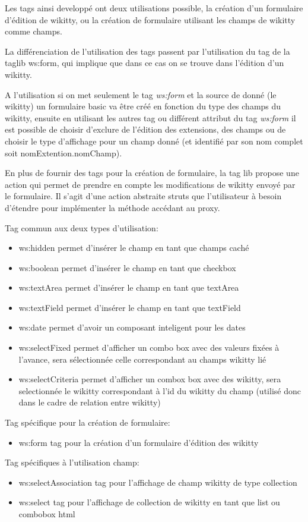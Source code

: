 Les tags ainsi developpé ont deux utilisations possible, la création d'un 
formulaire d'édition de wikitty, ou la création de formulaire utilisant les 
champs de wikitty comme champs. 

La différenciation de l'utilisation des tags passent par l'utilisation du tag 
de la taglib ws:form, qui implique que dans ce cas on se trouve dans l'édition d'un
wikitty.

A l'utilisation si on met seulement le tag \emph{ws:form} et la source de donné 
(le wikitty) un formulaire basic va être créé en fonction du type des champs
du wikitty, ensuite en utilisant les autres tag ou différent attribut du tag 
\emph{ws:form} il est possible de choisir d'exclure de l'édition des extensions,
des champs ou de choisir le type d'affichage pour un champ donné (et identifié
par son nom complet soit nomExtention.nomChamp).

En plus de fournir des tags pour la création de formulaire, la tag lib propose 
une action qui permet de prendre en compte les modifications de wikitty envoyé
par le formulaire. Il s'agit d'une action abstraite struts que l'utilisateur à 
besoin d'étendre pour implémenter la méthode accédant au proxy.

Tag commun aux deux types d'utilisation:
\begin{itemize}
\item ws:hidden permet d'insérer le champ en tant que champs caché
\item ws:boolean permet d'insérer le champ en tant que checkbox 
\item ws:textArea permet d'insérer le champ en tant que textArea
\item ws:textField permet d'insérer le champ en tant que textField
\item ws:date permet d'avoir un composant inteligent pour les dates 
\item ws:selectFixed permet d'afficher un combo box avec des valeurs fixées à 
l'avance, sera sélectionnée celle correspondant au champs wikitty lié
\item ws:selectCriteria permet d'afficher un combox box avec des wikitty, 
sera selectionnée le wikitty correspondant à l'id du wikitty du champ
(utilisé donc dans le cadre de relation entre wikitty)\\
\end{itemize}

Tag spécifique pour la création de formulaire:
\begin{itemize}
\item ws:form tag pour la création d'un formulaire d'édition des wikitty \\
\end{itemize}

Tag spécifiques à l'utilisation champ:
\begin{itemize}
\item ws:selectAssociation tag pour l'affichage de champ wikitty de type collection
\item ws:select tag pour l'affichage de collection de wikitty en tant que list ou combobox html
\end{itemize}



